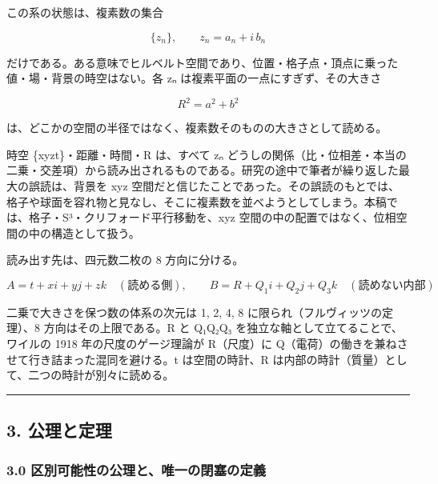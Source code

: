\documentclass[
  a4paper,
]{ltjsarticle}
\begin{document}
この系の状態は、複素数の集合

\[
\{z_n\},\qquad z_n=a_n+i\,b_n
\]

だけである。ある意味でヒルベルト空間であり、位置・格子点・頂点に乗った値・場・背景の時空はない。各
zₙ は複素平面の一点にすぎず、その大きさ

\[
R^2=a^2+b^2
\]

は、どこかの空間の半径ではなく、複素数そのものの大きさとして読める。

時空 \{xyzt\}・距離・時間・R は、すべて zₙ
どうしの関係（比・位相差・本当の二乗・交差項）から読み出されるものである。研究の途中で筆者が繰り返した最大の誤読は、背景を
xyz
空間だと信じたことであった。その誤読のもとでは、格子や球面を容れ物と見なし、そこに複素数を並べようとしてしまう。本稿では、格子・S³・クリフォード平行移動を、xyz
空間の中の配置ではなく、位相空間の中の構造として扱う。

読み出す先は、四元数二枚の 8 方向に分ける。

\[
A=t+xi+yj+zk\quad(\text{読める側}),\qquad B=R+Q_1i+Q_2j+Q_3k\quad(\text{読めない内部})
\]

二乗で大きさを保つ数の体系の次元は 1, 2, 4, 8
に限られ（フルヴィッツの定理）、8 方向はその上限である。R と Q₁Q₂Q₃
を独立な軸として立てることで、ワイルの 1918 年の尺度のゲージ理論が
R（尺度）に Q（電荷）の働きを兼ねさせて行き詰まった混同を避ける。t
は空間の時計、R は内部の時計（質量）として、二つの時計が別々に読める。

\begin{center}\rule{0.5\linewidth}{0.5pt}\end{center}

\subsection{3. 公理と定理}\label{ux516cux7406ux3068ux5b9aux7406}

\subsubsection{3.0
区別可能性の公理と、唯一の閉塞の定義}\label{ux533aux5225ux53efux80fdux6027ux306eux516cux7406ux3068ux552fux4e00ux306eux9589ux585eux306eux5b9aux7fa9}
\end{document}
